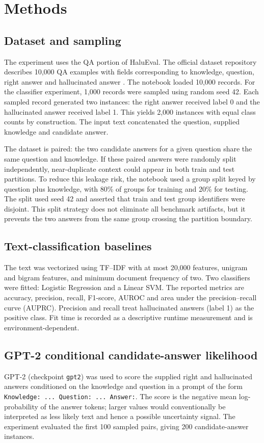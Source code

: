 \documentclass[11pt]{article}
\begin{document}
\section{Methods}
\subsection{Dataset and sampling}
The experiment uses the QA portion of HaluEval. The official dataset repository describes 10,000 QA examples with fields corresponding to knowledge, question, right answer and hallucinated answer \cite{rucaiboxhalueval}. The notebook loaded 10,000 records. For the classifier experiment, 1,000 records were sampled using random seed 42. Each sampled record generated two instances: the right answer received label 0 and the hallucinated answer received label 1. This yields 2,000 instances with equal class counts by construction. The input text concatenated the question, supplied knowledge and candidate answer.

The dataset is paired: the two candidate answers for a given question share the same question and knowledge. If these paired answers were randomly split independently, near-duplicate context could appear in both train and test partitions. To reduce this leakage risk, the notebook used a group split keyed by question plus knowledge, with 80\% of groups for training and 20\% for testing. The split used seed 42 and asserted that train and test group identifiers were disjoint. This split strategy does not eliminate all benchmark artifacts, but it prevents the two answers from the same group crossing the partition boundary.

\subsection{Text-classification baselines}
The text was vectorized using TF--IDF with at most 20,000 features, unigram and bigram features, and minimum document frequency of two. Two classifiers were fitted: Logistic Regression and a Linear SVM. The reported metrics are accuracy, precision, recall, F1-score, AUROC and area under the precision--recall curve (AUPRC). Precision and recall treat hallucinated answers (label 1) as the positive class. Fit time is recorded as a descriptive runtime measurement and is environment-dependent.

\subsection{GPT-2 conditional candidate-answer likelihood}
GPT-2 (checkpoint \texttt{gpt2}) was used to score the supplied right and hallucinated answers conditioned on the knowledge and question in a prompt of the form \texttt{Knowledge: ... Question: ... Answer:}. The score is the negative mean log-probability of the answer tokens; larger values would conventionally be interpreted as less likely text and hence a possible uncertainty signal. The experiment evaluated the first 100 sampled pairs, giving 200 candidate-answer instances.
\end{document}
